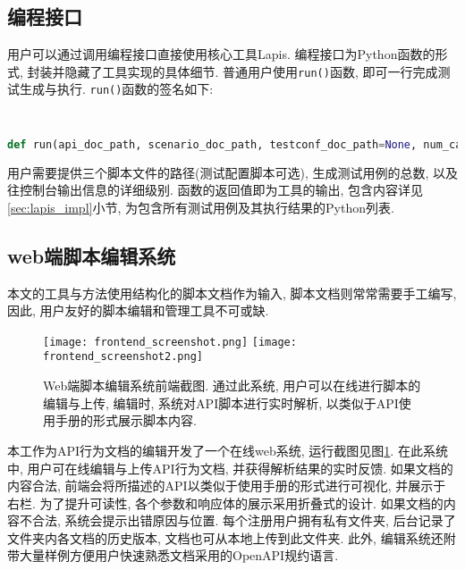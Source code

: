 		\subsection{编程接口}
            \label{sec:program_interface}
            用户可以通过调用编程接口直接使用核心工具Lapis. 编程接口为Python函数的形式, 封装并隐藏了工具实现的具体细节. 普通用户使用\texttt{run()}函数, 即可一行完成测试生成与执行. \texttt{run()}函数的签名如下:
            \begin{flushleft}
                \scriptsize
                \tt
                \begin{lstlisting}[language=python]
def run(api_doc_path, scenario_doc_path, testconf_doc_path=None, num_case=1, verbose=0)
                \end{lstlisting}
            \end{flushleft}
            用户需要提供三个脚本文件的路径(测试配置脚本可选), 生成测试用例的总数, 以及往控制台输出信息的详细级别. 函数的返回值即为工具的输出, 包含内容详见\ref{sec:lapis_impl}小节, 为包含所有测试用例及其执行结果的Python列表.
            
		\subsection{web端脚本编辑系统}

            本文的工具与方法使用结构化的脚本文档作为输入, 脚本文档则常常需要手工编写, 因此, 用户友好的脚本编辑和管理工具不可或缺.
            
            \begin{figure}[!htb]
                \centering
                \texttt{[image: frontend\_screenshot.png]}
                \texttt{[image: frontend\_screenshot2.png]}
                \caption{Web端脚本编辑系统前端截图. 通过此系统, 用户可以在线进行脚本的编辑与上传, 编辑时, 系统对API脚本进行实时解析, 以类似于API使用手册的形式展示脚本内容.}
                \label{fig:frontend_screenshot}
            \end{figure}
            
            本工作为API行为文档的编辑开发了一个在线web系统, 运行截图见图\ref{fig:frontend_screenshot}. 在此系统中, 用户可在线编辑与上传API行为文档, 并获得解析结果的实时反馈. 如果文档的内容合法, 前端会将所描述的API以类似于使用手册的形式进行可视化, 并展示于右栏. 为了提升可读性, 各个参数和响应体的展示采用折叠式的设计. 如果文档的内容不合法, 系统会提示出错原因与位置. 每个注册用户拥有私有文件夹, 后台记录了文件夹内各文档的历史版本, 文档也可从本地上传到此文件夹. 此外, 编辑系统还附带大量样例方便用户快速熟悉文档采用的OpenAPI规约语言.
            
